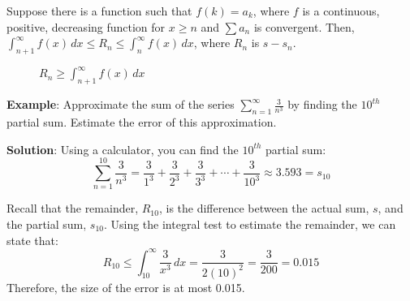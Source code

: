 Suppose there is a function such that $f(k) = a_k$, where $f$ is a continuous, 
positive, decreasing function for $x \geq n$ and $\sum a_n$ is convergent. 
Then, $\int_{n+1}^\infty f(x)\,dx \leq R_n \leq \int_n^\infty f(x)\,dx$, where 
$R_n$ is $s - s_n$. 

\begin{figure}[htbp]
    \centering
    \caption{$R_n \geq \int_{n+1}^\infty f(x)\,dx$ }
    \label{fig:remainderfloor}
\end{figure}

\textbf{Example}: Approximate the sum of the series $\sum_{n=1}^\infty 
\frac{3}{n^3}$ by finding the $10^{th}$ partial sum. Estimate the error of 
this approximation. 

\textbf{Solution}: Using a calculator, you can find the $10^{th}$ partial sum: 
$$\sum_{n=1}^{10} \frac{3}{n^3} = \frac{3}{1^3} + \frac{3}{2^3} + 
\frac{3}{3^3} + \cdots + \frac{3}{10^3} \approx 3.593 = s_{10}$$

Recall that the remainder, $R_{10}$, is the difference between the actual sum, 
$s$, and the partial sum, $s_{10}$. Using the integral test to estimate the 
remainder, we can state that: $$R_{10} \leq \int_{10}^\infty \frac{3}{x^3}\,dx 
= \frac{3}{2(10)^2} = \frac{3}{200} = 0.015$$ Therefore, the size of the error 
is at most 0.015. 

